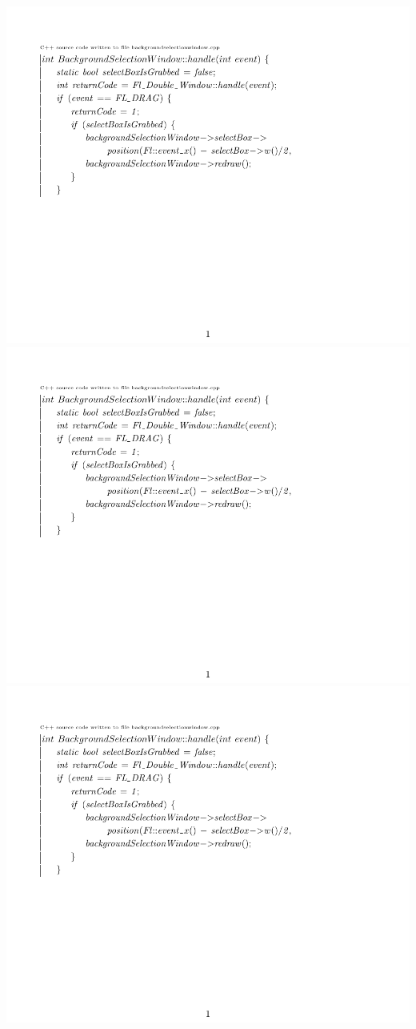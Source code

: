 \documentclass{article}
\begin{document}
\includegraphics[page=2]{backgroundselectionwindow.pdf}
\includegraphics[page=3]{backgroundselectionwindow.pdf}
\includegraphics[page=4]{backgroundselectionwindow.pdf}
\end{document}

